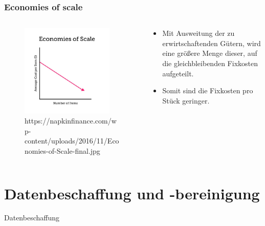 \documentclass{beamer}
\begin{document}
\begin{frame}
\frametitle{Economies of scale}

\begin{columns}
    \begin{column}{0.5\textwidth}
  \begin{figure}[h]
    \centering
      \includegraphics[width=0.9\textwidth]{economies_of_scale}
      \caption{https://napkinfinance.com/wp-content/uploads/2016/11/Economies-of-Scale-final.jpg}
  \end{figure}
    \end{column}
    \begin{column}{0.5\textwidth}
    \begin{itemize}
    \item
  Mit Ausweitung der zu
  erwirtschaftenden Gütern,
  wird eine größere Menge
  dieser, auf die
  gleichbleibenden Fixkosten
  aufgeteilt.
\item
  Somit sind die Fixkosten pro
  Stück geringer.

    \end{itemize}
    \end{column}
\end{columns}
\end{frame}


\section{Datenbeschaffung und -bereinigung}
\begin{frame}
	\begin{center}
		{\Huge Datenbeschaffung}
	\end{center}
\end{frame}
\end{document}
